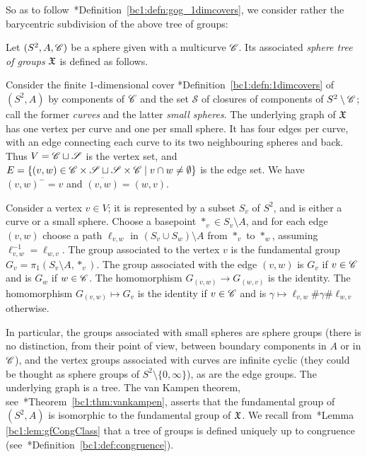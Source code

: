 \documentclass{amsart}
\begin{document}
So as to
follow~\cite{bartholdi-dudko:bc1}*{Definition~\ref{bc1:defn:gog_1dimcovers}},
we consider rather the barycentric subdivision of the above tree of
groups:
\begin{defn}\label{defn:gfofgroups}
  Let $(S^2,A,{\mathscr C})$ be a sphere given with a multicurve ${\mathscr C}$. Its
  associated \emph{sphere tree of groups} ${\mathfrak X}$ is defined as follows.

  Consider the finite $1$-dimensional cover
  \cite{bartholdi-dudko:bc1}*{Definition~\ref{bc1:defn:1dimcovers}} of
  $(S^2,A)$ by components of ${\mathscr C}$ and the set $\mathscr S$ of
  closures of components of $S^2\setminus{\mathscr C}$; call the former
  \emph{curves} and the latter \emph{small spheres}.  The underlying
  graph of ${\mathfrak X}$ has one vertex per curve and one per small sphere. It
  has four edges per curve, with an edge connecting each curve to its
  two neighbouring spheres and back. Thus
  $V={\mathscr C}\sqcup\mathscr S$ is the vertex set, and
  $E=\{(v,w)\in{\mathscr C}\times\mathscr S\sqcup\mathscr S\times{\mathscr C}\mid
  v\cap w\neq\emptyset\}$ is the edge set. We have $(v,w)^-=v$ and
  $\overline{(v,w)}=(w,v)$.

  Consider a vertex $v\in V$; it is represented by a subset $S_v$ of
  $S^2$, and is either a curve or a small sphere. Choose a basepoint
  $*_v\in S_v\setminus A$, and for each edge $(v,w)$ choose a path
  $\ell_{v,w}$ in $(S_v\cup S_w)\setminus A$ from $*_v$ to $*_w$,
  assuming $\ell_{v,w}^{-1}=\ell_{w,v}$. The group associated to the
  vertex $v$ is the fundamental group $G_v=\pi_1(S_v\setminus
  A,*_v)$. The group associated with the edge $(v,w)$ is $G_v$ if
  $v\in{\mathscr C}$ and is $G_w$ if $w\in{\mathscr C}$. The homomorphism $G_{(v,w)}\to
  G_{(w,v)}$ is the identity. The homomorphism $G_{(v,w)}\mapsto G_v$
  is the identity if $v\in{\mathscr C}$ and is
  $\gamma\mapsto\ell_{v,w}\#\gamma\#\ell_{w,v}$ otherwise.
\end{defn}  
In particular, the groups associated with small spheres are sphere
groups (there is no distinction, from their point of view, between
boundary components in $A$ or in ${\mathscr C}$), and the vertex groups
associated with curves are infinite cyclic (they could be thought as
sphere groups of $S^2\setminus \{0,\infty\}$), as are the edge
groups. The underlying graph is a tree.  The van Kampen theorem,
see~\cite{bartholdi-dudko:bc1}*{Theorem~\ref{bc1:thm:vankampen}},
asserts that the fundamental group of $(S^2,A)$ is isomorphic to the
fundamental group of ${\mathfrak X}$.  We recall
from~\cite{bartholdi-dudko:bc1}*{Lemma \ref{bc1:lem:gfCongClass}} that
a tree of groups is defined uniquely up to congruence
(see~\cite{bartholdi-dudko:bc1}*{Definition~\ref{bc1:def:congruence}}).
\end{document}
